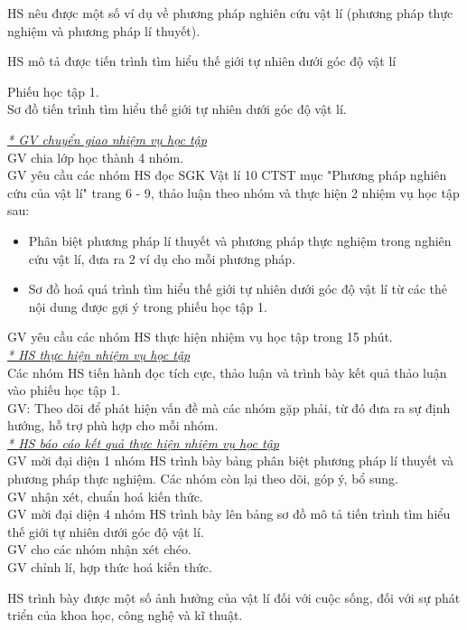 {
HS nêu được một số ví dụ về phương pháp nghiên cứu vật lí (phương pháp thực nghiệm và phương pháp lí thuyết).

 HS mô tả được tiến trình tìm hiểu thế giới tự nhiên dưới góc độ vật lí
}
{Phiếu học tập 1.\\
	Sơ đồ tiến trình tìm hiểu thế giới tự nhiên dưới góc độ vật lí.

}
{
	\textit{\underline{
* GV chuyển giao nhiệm vụ học tập	
}}\\
GV chia lớp học thành 4 nhóm.\\
GV yêu cầu các nhóm HS đọc SGK Vật lí 10 CTST mục "Phương pháp nghiên cứu của vật lí" trang 6 - 9, thảo luận theo nhóm và thực hiện 2 nhiệm vụ học tập sau:
\begin{itemize}
	\item Phân biệt phương pháp lí thuyết và phương pháp thực nghiệm trong nghiên cứu vật lí, đưa ra 2 ví dụ cho mỗi phương pháp.
	\item Sơ đồ hoá quá trình tìm hiểu thế giới tự nhiên dưới góc độ vật lí từ các thẻ nội dung được gợi ý trong phiếu học tập 1.
\end{itemize}
GV yêu cầu các nhóm HS thực hiện nhiệm vụ học tập trong 15 phút.\\
\textit{\underline{
* HS thực hiện nhiệm vụ học tập
}}\\
Các nhóm HS tiến hành đọc tích cực, thảo luận và trình bày kết quả thảo luận vào phiếu học tập 1.\\
GV: Theo dõi để phát hiện vấn đề mà các nhóm gặp phải, từ đó đưa ra sự định hướng, hỗ trợ phù hợp cho mỗi nhóm.\\
\textit{\underline{
* HS báo cáo kết quả thực hiện nhiệm vụ học tập}}\\
GV mời đại diện 1 nhóm HS trình bày bảng phân biệt phương pháp lí thuyết và phương pháp thực nghiệm. Các nhóm còn lại theo dõi, góp ý, bổ sung.\\
GV nhận xét, chuẩn hoá kiến thức.\\
GV mời đại diện 4 nhóm HS trình bày lên bảng sơ đồ mô tả tiến trình tìm hiểu thế giới tự nhiên dưới góc độ vật lí.\\
GV cho các nhóm nhận xét chéo.\\
GV chỉnh lí, hợp thức hoá kiến thức.
}
{
HS trình bày được một số ảnh hưởng của vật lí đối với cuộc sống, đối với sự phát triển của khoa học, công nghệ và kĩ thuật.
}

